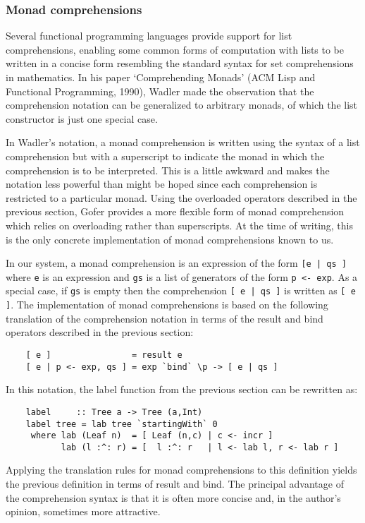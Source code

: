 \subsubsection{Monad comprehensions}
Several functional programming languages provide support for list
comprehensions, enabling some common forms of computation with lists to
be written in a concise form resembling the standard syntax for set
comprehensions in mathematics.  In his paper `Comprehending Monads'
(ACM Lisp and Functional Programming, 1990), Wadler made the
observation that the comprehension notation can be generalized to
arbitrary monads, of which the list constructor is just one special
case.

In Wadler's notation, a monad comprehension is written using the syntax
of a list comprehension but with a superscript to indicate the monad in
which the comprehension is to be interpreted.  This is a little awkward
and makes the notation less powerful than might be hoped since each
comprehension is restricted to a particular monad.  Using the
overloaded operators described in the previous section, Gofer provides
a more flexible form of monad comprehension which relies on overloading
rather than superscripts.  At the time of writing, this is the only
concrete implementation of monad comprehensions known to us.

In our system, a monad comprehension is an expression of the form
\verb"[e | qs ]" where \verb"e" is an expression and \verb"gs" is a list of generators of
the form \verb"p <- exp".  As a special case, if \verb"gs" is empty then the
comprehension \verb"[ e | qs ]" is written as \verb"[ e ]".  The implementation of
monad comprehensions is based on the following translation of the
comprehension notation in terms of the result and bind operators
described in the previous section:
\begin{verbatim}
    [ e ]                = result e
    [ e | p <- exp, qs ] = exp `bind` \p -> [ e | qs ]
\end{verbatim}
In this notation, the label function from the previous section can
be rewritten as:
\begin{verbatim}
    label     :: Tree a -> Tree (a,Int)
    label tree = lab tree `startingWith` 0
     where lab (Leaf n)  = [ Leaf (n,c) | c <- incr ]
           lab (l :^: r) = [  l :^: r   | l <- lab l, r <- lab r ]
\end{verbatim}
Applying the translation rules for monad comprehensions to this
definition yields the previous definition in terms of result and bind.
The principal advantage of the comprehension syntax is that it is often
more concise and, in the author's opinion, sometimes more attractive.


